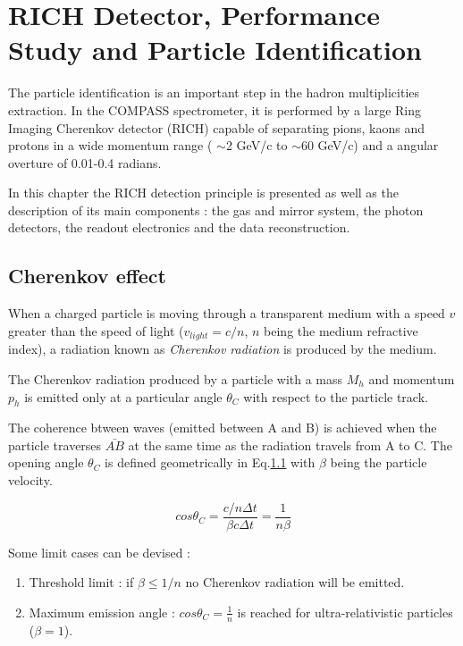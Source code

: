 
\chapter{RICH Detector, Performance Study and Particle Identification}
\label{ch:trig} %


The particle identification is an important step in the hadron multiplicities extraction.
In the COMPASS spectrometer, it is performed by a large Ring Imaging Cherenkov detector (RICH)
capable of separating pions, kaons and protons in a wide momentum range ( $\sim$2 GeV/c to $\sim$60 GeV/c)
and a angular overture of 0.01-0.4 radians.

In this chapter the RICH detection principle is presented as well as the description of its main components :
the gas and mirror system, the photon detectors, the readout electronics and the data reconstruction.

\section{Cherenkov effect}

When a charged particle is moving through a transparent medium with a speed $v$ greater than the speed of light
($v_{light} = c/n$, $n$ being the medium refractive index), a radiation known as \textit{Cherenkov radiation} is
produced by the medium.

The Cherenkov radiation produced by a particle with a mass $M_h$ and momentum $p_h$ is emitted only at a particular
angle $\theta_C$ with respect to the particle track.

The coherence btween waves (emitted between A and B) is achieved when the particle traverses $\bar{AB}$ at the same time
as the radiation travels from A to C. The opening angle $\theta_C$ is defined geometrically in Eq.\ref{} with $\beta$ being
the particle velocity.

\begin{equation}
  cos\theta_C = \frac{c/n \Delta t}{\beta c \Delta t} = \frac{1}{n\beta}
\end{equation}

Some limit cases can be devised :
\begin{enumerate}
  \item Threshold limit : if $\beta \leq 1/n$ no Cherenkov radiation will be emitted.
  \item Maximum emission angle : $cos \theta_C = \frac{1}{n}$ is reached for ultra-relativistic particles ($\beta = 1$).
\end{enumerate}

